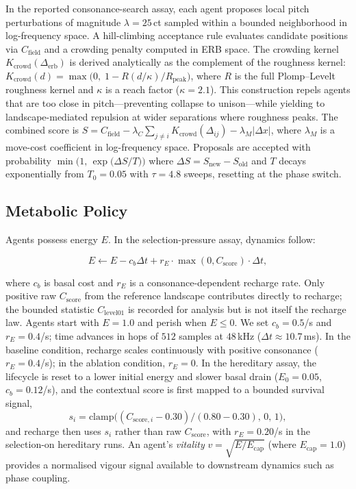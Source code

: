 \documentclass[letterpaper]{article}
\begin{document}
In the reported consonance-search assay, each agent proposes local pitch perturbations of magnitude $\lambda=25$\,ct sampled within a bounded neighborhood in log-frequency space. A hill-climbing acceptance rule evaluates candidate positions via $C_{\text{field}}$ and a crowding penalty computed in ERB space. The crowding kernel $K_{\text{crowd}}(\Delta_{\text{erb}})$ is derived analytically as the complement of the roughness kernel: $K_{\text{crowd}}(d) = \max\!\bigl(0,\; 1 - R(d/\kappa) / R_{\text{peak}}\bigr)$, where $R$ is the full Plomp--Levelt roughness kernel and $\kappa$ is a reach factor ($\kappa=2.1$). This construction repels agents that are too close in pitch---preventing collapse to unison---while yielding to landscape-mediated repulsion at wider separations where roughness peaks. The combined score is $S = C_{\text{field}} - \lambda_C \sum_{j \neq i} K_{\text{crowd}}(\Delta_{ij}) - \lambda_M |\Delta x|$, where $\lambda_M$ is a move-cost coefficient in log-frequency space. Proposals are accepted with probability $\min\!\bigl(1,\,\exp\bigl(\Delta S/T\bigr)\bigr)$ where $\Delta S = S_{\text{new}} - S_{\text{old}}$ and $T$ decays exponentially from $T_0=0.05$ with $\tau=4.8$ sweeps, resetting at the phase switch.

\subsection{Metabolic Policy}

Agents possess energy $E$. In the selection-pressure assay, dynamics follow:

\begin{equation}
E \leftarrow E - c_b \Delta t + r_E \cdot \max(0, C_{\text{score}}) \cdot \Delta t,
\end{equation}

where $c_b$ is basal cost and $r_E$ is a consonance-dependent recharge rate. Only positive raw $C_{\text{score}}$ from the reference landscape contributes directly to recharge; the bounded statistic $C_{\text{level01}}$ is recorded for analysis but is not itself the recharge law. Agents start with $E=1.0$ and perish when $E\leq 0$. We set $c_b=0.5$/s and $r_E=0.4$/s; time advances in hops of $512$ samples at $48\,$kHz ($\Delta t\approx 10.7\,$ms). In the baseline condition, recharge scales continuously with positive consonance ($r_E=0.4$/s); in the ablation condition, $r_E=0$. In the hereditary assay, the lifecycle is reset to a lower initial energy and slower basal drain ($E_0=0.05$, $c_b=0.12$/s), and the contextual score is first mapped to a bounded survival signal,
\[
s_i = \mathrm{clamp}\!\bigl((C_{\text{score},i}-0.30)/(0.80-0.30),\,0,\,1\bigr),
\]
and recharge then uses $s_i$ rather than raw $C_{\text{score}}$, with $r_E=0.20$/s in the selection-on hereditary runs. An agent's \emph{vitality} $v = \sqrt{E/E_{\text{cap}}}$ (where $E_{\text{cap}}=1.0$) provides a normalised vigour signal available to downstream dynamics such as phase coupling.
\end{document}
